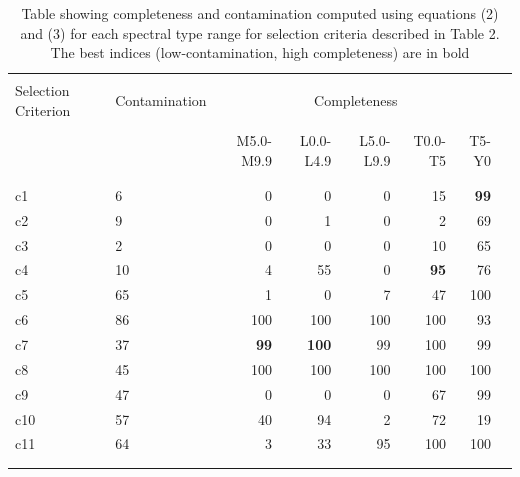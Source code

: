 \documentclass[preprint]{aastex}
\begin{document}
\clearpage
\begin{table}
\center
\begin{tabular}{llrrrrrr}
\\ \hline \hline \\
  Selection Criterion &  Contamination & \multicolumn{5}{c|}{Completeness} \\
  \hline \\
  & &  M5.0-M9.9 & L0.0-L4.9 &  L5.0-L9.9 &  T0.0-T5 &  T5-Y0\\
\\ \hline \hline \\
   c1 &              6 &          0 &          0 &          0 &       15 &     \textbf{99} \\
   c2 &              9 &          0 &          1 &          0 &        2 &     69 \\
   c3 &              2 &          0 &          0 &          0 &       10 &     65\\ 
   c4&             10 &          4 &         55 &          0 &       \textbf{95} &     76 \\ 
   c5 &             65 &          1 &          0 &          7 &       47 &    100 \\
   c6 &             86 &        100 &        100 &        100 &      100 &     93 \\   
   c7 &             37 &         \textbf{99} &        \textbf{100} &         99 &      100 &     99 \\ 
   c8 &             45 &        100 &        100 &        100 &      100 &    100 \\  
   c9 &             47 &          0 &          0 &          0 &       67 &     99 \\ 
   c10 &             57 &         40 &         94 &          2 &       72 &     19 \\
   c11 &             64 &         3 &         33 &          95 &       100 &     100\\
\\ \hline \hline \\
\end{tabular}
\caption{Table showing completeness and contamination computed using equations (2) and (3) for each spectral type range for selection criteria described in Table 2. The best indices (low-contamination, high completeness) are in bold}
\end{table}

\clearpage

\end{document}
